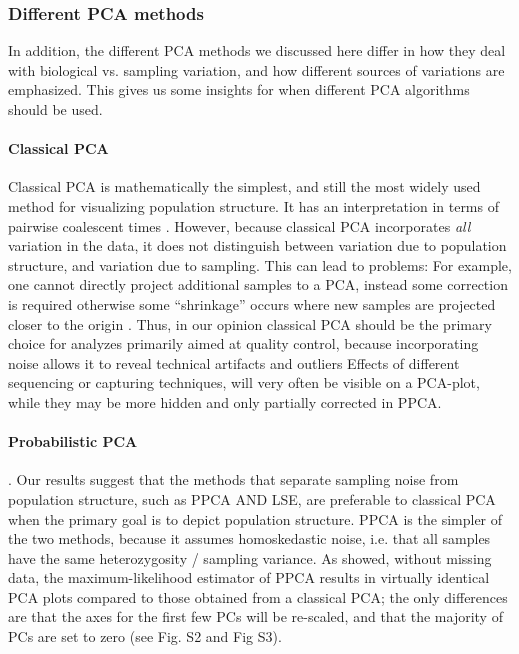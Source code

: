 \documentclass[12pt, letterpaper]{article}
\begin{document}
\subsubsection{Different PCA methods}
In addition, the different PCA methods we discussed here differ in how they deal with biological vs. sampling variation, and how different sources of variations are emphasized. This gives us some insights for when different PCA algorithms should be used. 

\paragraph{Classical PCA}
Classical PCA is mathematically the simplest, and still the most widely used method for visualizing population structure. It has an interpretation in terms of pairwise coalescent times \citep{mcvean_genealogical_2009}. However, because classical PCA incorporates \emph{all} variation in the data, it does not distinguish between variation due to population structure, and variation due to sampling. This can lead to problems: For example, one cannot directly project additional samples to a PCA, instead some correction is required otherwise some ``shrinkage'' occurs where new samples are projected closer to the origin \citep{patterson_population_2006, wang_improved_2015}.  Thus, in our opinion classical PCA should be the primary choice for analyzes primarily aimed at quality control, because incorporating noise allows it to reveal technical artifacts and outliers Effects of different sequencing or capturing techniques, will very often be visible on a PCA-plot, while they may be more hidden and only partially corrected in PPCA.

\paragraph{Probabilistic PCA}. Our results suggest that the methods that separate sampling noise from population structure, such as PPCA AND LSE, are preferable to classical PCA when the primary goal is to depict population structure. PPCA is the simpler of the two methods, because it assumes homoskedastic noise, i.e. that all samples have the same heterozygosity / sampling variance. As \cite{tipping_probabilistic_1999-1} showed, without missing data, the maximum-likelihood estimator of PPCA results in virtually identical PCA plots compared to those obtained from a classical PCA; the only differences are that the axes for the first few PCs will be re-scaled, and that the majority of PCs are set to zero (see Fig. S2 and Fig S3).
\end{document}
